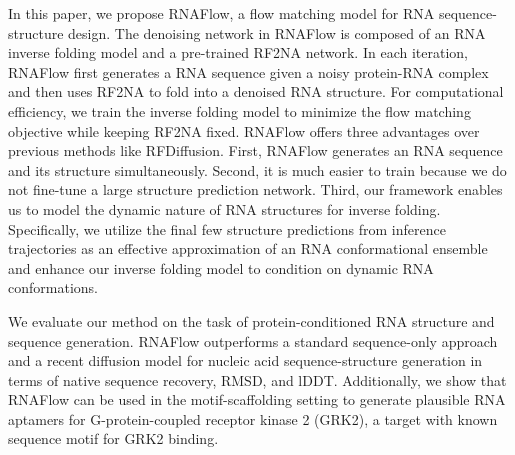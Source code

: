 In this paper, we propose RNAFlow, a flow matching model for RNA sequence-structure design. The denoising network in RNAFlow is composed of an RNA inverse folding model and a pre-trained RF2NA network. In each iteration, RNAFlow first generates a RNA sequence given a noisy protein-RNA complex and then uses RF2NA to fold into a denoised RNA structure. For computational efficiency, we train the inverse folding model to minimize the flow matching objective while keeping RF2NA fixed. RNAFlow offers three advantages over previous methods like RFDiffusion. First, RNAFlow generates an RNA sequence and its structure simultaneously. Second, it is much easier to train because we do not fine-tune a large structure prediction network. Third, our framework enables us to model the dynamic nature of RNA structures for inverse folding. Specifically, we utilize the final few structure predictions from inference trajectories as an effective approximation of an RNA conformational ensemble and enhance our inverse folding model to condition on dynamic RNA conformations.

We evaluate our method on the task of protein-conditioned RNA structure and sequence generation. RNAFlow outperforms a standard sequence-only approach and a recent diffusion model \cite{morehead2023towards} for nucleic acid sequence-structure generation in terms of native sequence recovery, RMSD, and lDDT. Additionally, we show that RNAFlow can be used in the motif-scaffolding setting to generate plausible RNA aptamers for G-protein-coupled receptor kinase 2 (GRK2), a target with known sequence motif for GRK2 binding.